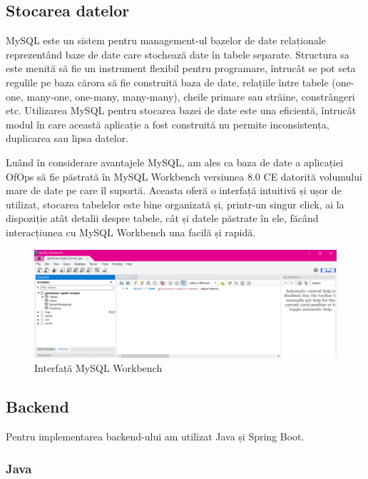 \subsection{Stocarea datelor}
MySQL este un sistem pentru management-ul bazelor de date relaționale reprezentând baze de date care stochează date în tabele separate.\cite{citation2} Structura sa este menită să fie un instrument flexibil pentru programare, întrucât se pot seta regulile pe baza cărora să fie construită baza de date, relațiile între tabele (one-one, many-one, one-many, many-many), cheile primare sau străine, constrângeri etc. Utilizarea MySQL pentru stocarea bazei de date este una eficientă, întrucât modul în care această aplicație a fost construită nu permite inconsistența, duplicarea sau lipsa datelor.

Luând în considerare avantajele MySQL, am ales ca baza de date a aplicației OfOps să fie păstrată în MySQL Workbench versiunea 8.0 CE datorită volumului mare de date pe care îl suportă. Aceasta oferă o interfață intuitivă și ușor de utilizat, stocarea tabelelor este bine organizată și, printr-un singur click, ai la dispoziție atât detalii despre tabele, cât și datele păstrate în ele, făcând interacțiunea cu MySQL Workbench una facilă și rapidă.


\begin{figure}[!htb]
    \centering
    \includegraphics[width=0.9\linewidth]{images/interfata-mysql.png}
    \caption{Interfață MySQL Workbench}
    \label{fig:interfata-mysql}
\end{figure}


\subsection{Backend}
Pentru implementarea backend-ului am utilizat Java și Spring Boot. 

\newpage

\begin{minipage}{\textwidth}
\hfill
\begin{minipage}{0.9\textwidth}
\subsubsection{Java}
\end{minipage}
\end{minipage}

